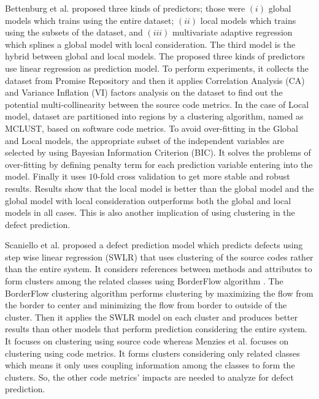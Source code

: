 \documentclass[12pt]{report}
\begin{document}
Bettenburg et al. \cite{bettenburg2012think} proposed three kinds of predictors; those were $(i)$ global models which trains using the entire dataset; $(ii)$ local models which trains using the subsets of the dataset, and $(iii)$ multivariate adaptive regression which splines a global model with local consideration. The third model is the hybrid between global and local models. The proposed three kinds of predictors use linear regression as prediction model. To perform experiments, it collects the dataset from Promise Repository \cite{promise12} and then it applies Correlation Analysis (CA) and Variance Inflation (VI) factors analysis on the dataset to find out the potential multi-collinearity between the source code metrics. In the case of Local model, dataset are partitioned into regions by a clustering algorithm, named as MCLUST, based on software code metrics. To avoid over-fitting in the Global and Local models, the appropriate subset of the independent variables are selected by using Bayesian Information Criterion (BIC). It solves the problems of over-fitting by defining penalty term for each prediction variable entering into the model. Finally it uses $10$-fold cross validation to get more stable and robust results. Results show that the local model is better than the global model and the global model with local consideration outperforms both the global and local models in all cases. This is also another implication of using clustering in the defect prediction. 
 
Scaniello et al. \cite{scanniello2013class} proposed a defect prediction model which predicts defects using step wise linear regression (SWLR) that uses clustering of the source codes rather than the entire system. It considers references between methods and attributes to form clusters among the related classes using BorderFlow algorithm \cite{ngomo2010low}. The BorderFlow clustering algorithm performs clustering by maximizing the flow from the border to center and minimizing the flow from border to outside of the cluster. Then it applies the SWLR model on each cluster and produces better results than other models that perform prediction considering the entire system. It focuses on clustering using source code whereas Menzies et al. \cite{menzies2013local,menzies2011local} focuses on clustering using code metrics. It forms clusters considering only related classes which means it only uses coupling information among the classes to form the clusters. So, the other code metrics' impacts are needed to analyze for defect prediction.  
\end{document}
